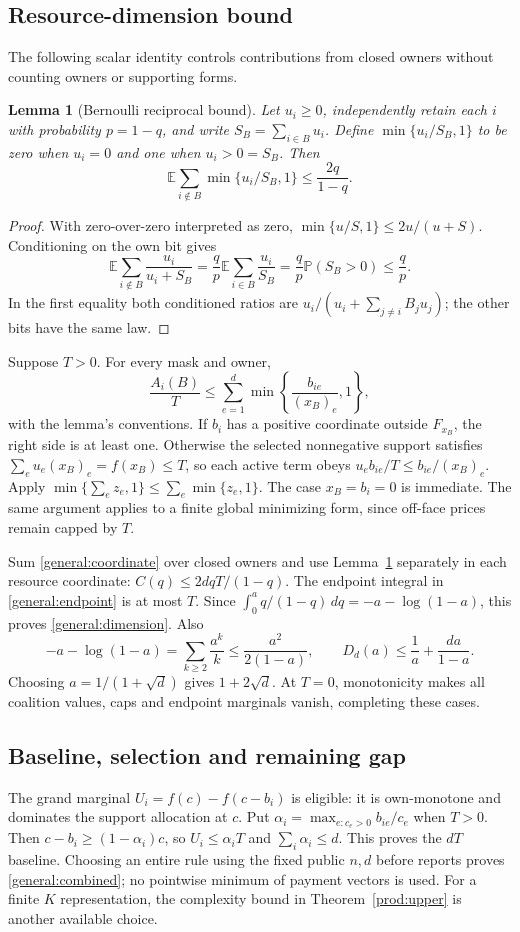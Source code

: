 \documentclass[11pt]{article}
\newtheorem{lemma}[theorem]{Lemma}
\theoremstyle{definition}\newtheorem{definition}[theorem]{Definition}
\theoremstyle{remark}\newtheorem{remark}[theorem]{Remark}
\newcommand{\E}{\mathbb E}
\newcommand{\Prob}{\mathbb P}
\begin{document}
\subsection{Resource-dimension bound}
The following scalar identity controls contributions from closed owners
without counting owners or supporting forms.
\begin{lemma}[Bernoulli reciprocal bound]\label{general:reciprocal}
Let $u_i\ge0$, independently retain each $i$ with probability $p=1-q$, and
write $S_B=\sum_{i\in B}u_i$. Define $\min\{u_i/S_B,1\}$ to be zero when
$u_i=0$ and one when $u_i>0=S_B$. Then
\[
 \E\sum_{i\notin B}\min\{u_i/S_B,1\}\le\frac{2q}{1-q}.
\]
\end{lemma}
\begin{proof}
With zero-over-zero interpreted as zero,
$\min\{u/S,1\}\le2u/(u+S)$. Conditioning on the own bit gives
\[
 \E\sum_{i\notin B}\frac{u_i}{u_i+S_B}
 =\frac qp\E\sum_{i\in B}\frac{u_i}{S_B}
 =\frac qp\Prob(S_B>0)\le\frac qp.
\]
In the first equality both conditioned ratios are
$u_i/(u_i+\sum_{j\ne i}B_ju_j)$; the other bits have the same law.
\end{proof}

Suppose $T>0$. For every mask and owner,
\begin{equation}\label{general:coordinate}
 \frac{A_i(B)}T\le
 \sum_{e=1}^d\min\left\{\frac{b_{ie}}{(x_B)_e},1\right\},
\end{equation}
with the lemma's conventions. If $b_i$ has a positive coordinate outside
$F_{x_B}$, the right side is at least one. Otherwise the selected nonnegative
support satisfies $\sum_eu_e(x_B)_e=f(x_B)\le T$, so each active term obeys
$u_eb_{ie}/T\le b_{ie}/(x_B)_e$. Apply
$\min\{\sum_e z_e,1\}\le\sum_e\min\{z_e,1\}$.
The case $x_B=b_i=0$ is immediate. The same argument applies to a finite
global minimizing form, since off-face prices remain capped by $T$.

Sum \eqref{general:coordinate} over closed owners and use
Lemma~\ref{general:reciprocal} separately in each resource coordinate:
$C(q)\le 2dqT/(1-q)$. The endpoint integral in
\eqref{general:endpoint} is at most $T$. Since
$\int_0^a q/(1-q)\,dq=-a-\log(1-a)$, this proves
\eqref{general:dimension}. Also
\[
 -a-\log(1-a)=\sum_{k\ge2}\frac{a^k}{k}
 \le\frac{a^2}{2(1-a)},\qquad
 D_d(a)\le\frac1a+\frac{da}{1-a}.
\]
Choosing $a=1/(1+\sqrt d)$ gives $1+2\sqrt d$.
At $T=0$, monotonicity makes all coalition values, caps and endpoint
marginals vanish, completing these cases.

\subsection{Baseline, selection and remaining gap}
The grand marginal $U_i=f(c)-f(c-b_i)$ is eligible: it is own-monotone and
dominates the support allocation at $c$. Put
$\alpha_i=\max_{e:c_e>0}b_{ie}/c_e$ when $T>0$.
Then $c-b_i\ge(1-\alpha_i)c$, so $U_i\le\alpha_iT$ and
$\sum_i\alpha_i\le d$. This proves the $dT$ baseline.
Choosing an entire rule using the fixed public $n,d$ before reports proves
\eqref{general:combined}; no pointwise minimum of payment vectors is used.
For a finite $K$ representation, the complexity bound in
Theorem~\ref{prod:upper} is another available choice.
\end{document}
